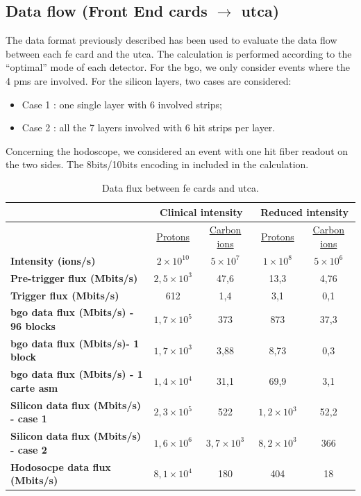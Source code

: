 \subsection{Data flow (Front End cards  $\rightarrow$ \gls{utca})\newline}\label{chapappA::subsec::dataFlow}
The data format previously described has been used to evaluate the data flow between each \gls{fe} card and the \gls{utca}. The calculation is performed according to the \enquote{optimal} mode of each detector. For the \gls{bgo}, we only consider events where the 4 \glspl{pm} are involved. For the silicon layers, two cases are considered:
\begin{itemize}
	\item Case 1 : one single layer with 6 involved strips;
	\item Case 2 : all the 7 layers involved with 6 hit strips per layer.
\end{itemize}
Concerning the hodoscope, we considered an event with one hit fiber readout on the two sides.\newline
The 8bits/10bits encoding in included in the calculation.

\begin{table} [!htbp]
\centering
\caption{Data flux between \gls{fe} cards and \gls{utca}.}
\label{chapappA::tab::dataFlowFEuTCA}
\begin{tabular}{m{3.5cm} c c c c}
\toprule
\rowcolor{myColorMainA!20}
		&\multicolumn{2}{c}{\textbf{Clinical intensity}} &\multicolumn{2}{c}{\textbf{Reduced intensity}} \\
\midrule
		& \underline{Protons}& \underline{Carbon ions} & \underline{Protons}& \underline{Carbon ions} \\
\midrule
\textbf{Intensity (ions/s)}		& $2\times10^{10}$	&$5\times10^{7}$  & $1\times10^{8}$& $5\times10^{6}$  \\
\textbf{Pre-trigger flux (Mbits/s)}		& 	$2,5\times10^{3}$& 47,6 &  13,3&4,76 \\
\textbf{Trigger flux (Mbits/s)}		& 	612& 1,4 & 3,1&0,1\\
\textbf{\gls{bgo} data flux (Mbits/s) - 96 blocks}		& 	$1,7\times10^{5}$& 373 & 873&37,3\\
\textbf{\gls{bgo} data flux (Mbits/s)- 1 block}		& 	$1,7\times10^{3}$& 3,88 & 8,73&0,3 \\
\textbf{\gls{bgo} data flux (Mbits/s) - 1 carte \gls{asm}}		& 	$1,4\times10^{4}$& 31,1 & 69,9&3,1\\
\textbf{Silicon data flux (Mbits/s) - case 1}		& 	$2,3\times10^{5}$& 522 & $1,2\times10^{3}$ & 52,2 \\
\textbf{Silicon data flux (Mbits/s) - case 2}		& 	$1,6\times10^{6}$&  $ 3,7\times10^{3}$ &  $8,2\times10^{3}$&366 \\
\textbf{Hodosocpe data flux (Mbits/s)}		& 	$8,1\times10^{4}$& 180 & 404 &18\\
\bottomrule
\end{tabular}
\end{table}



